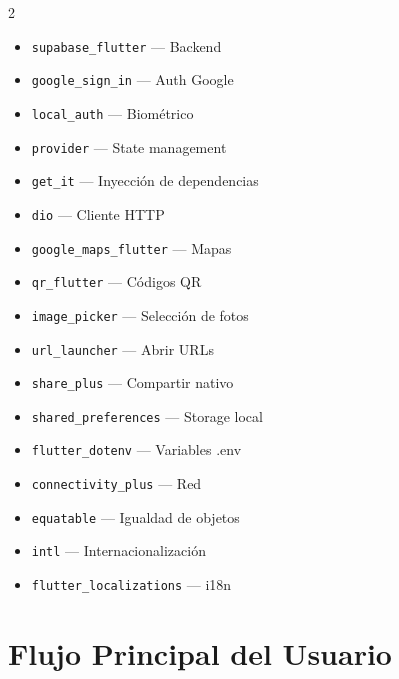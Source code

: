 \documentclass[12pt,a4paper]{article}
\begin{document}
\begin{multicols}{2}
\begin{itemize}[leftmargin=0.5cm, itemsep=1pt]
    \item \texttt{supabase\_flutter} --- Backend
    \item \texttt{google\_sign\_in} --- Auth Google
    \item \texttt{local\_auth} --- Biom\'etrico
    \item \texttt{provider} --- State management
    \item \texttt{get\_it} --- Inyecci\'on de dependencias
    \item \texttt{dio} --- Cliente HTTP
    \item \texttt{google\_maps\_flutter} --- Mapas
    \item \texttt{qr\_flutter} --- C\'odigos QR
    \item \texttt{image\_picker} --- Selecci\'on de fotos
    \item \texttt{url\_launcher} --- Abrir URLs
    \item \texttt{share\_plus} --- Compartir nativo
    \item \texttt{shared\_preferences} --- Storage local
    \item \texttt{flutter\_dotenv} --- Variables .env
    \item \texttt{connectivity\_plus} --- Red
    \item \texttt{equatable} --- Igualdad de objetos
    \item \texttt{intl} --- Internacionalizaci\'on
    \item \texttt{flutter\_localizations} --- i18n
\end{itemize}
\end{multicols}

\section{Flujo Principal del Usuario}
\end{document}
